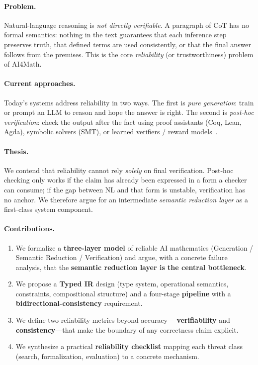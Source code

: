 \documentclass[11pt]{article}
\begin{document}
\paragraph{Problem.}
Natural-language reasoning is \emph{not directly verifiable}. A paragraph of CoT has no
formal semantics: nothing in the text guarantees that each inference step preserves
truth, that defined terms are used consistently, or that the final answer follows from
the premises. This is the core \emph{reliability} (or trustworthiness) problem of
AI4Math.

\paragraph{Current approaches.}
Today's systems address reliability in two ways. The first is \emph{pure generation}:
train or prompt an LLM to reason and hope the answer is right. The second is
\emph{post-hoc verification}: check the output after the fact using proof assistants
(Coq, Lean, Agda), symbolic solvers (SMT), or learned verifiers / reward
models~\cite{cobbe2021training,lightman2024lets,wang2024mathshepherd}.

\paragraph{Thesis.}
We contend that reliability cannot rely \emph{solely} on final verification. Post-hoc
checking only works if the claim has already been expressed in a form a checker can
consume; if the gap between NL and that form is unstable, verification has no anchor.
We therefore argue for an intermediate \emph{semantic reduction layer} as a first-class
system component.

\paragraph{Contributions.}
\begin{enumerate}
    \item We formalize a \textbf{three-layer model} of reliable AI mathematics
          (Generation / Semantic Reduction / Verification) and argue, with a concrete
          failure analysis, that the \textbf{semantic reduction layer is the central
          bottleneck}.
    \item We propose a \textbf{Typed IR} design (type system, operational semantics,
          constraints, compositional structure) and a four-stage
          \textbf{pipeline} with a \textbf{bidirectional-consistency} requirement.
    \item We define two reliability metrics beyond accuracy---
          \textbf{verifiability} and \textbf{consistency}---that make the boundary of
          any correctness claim explicit.
    \item We synthesize a practical \textbf{reliability checklist} mapping each threat
          class (search, formalization, evaluation) to a concrete mechanism.
\end{enumerate}
\end{document}
